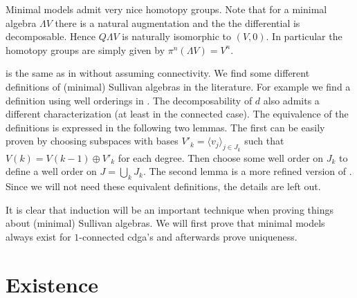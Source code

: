 Minimal models admit very nice homotopy groups. Note that for a minimal algebra $\Lambda V$ there is a natural augmentation and the the differential is decomposable. Hence $Q \Lambda V$ is naturally isomorphic to $(V, 0)$. In particular the homotopy groups are simply given by $\pi^n(\Lambda V) = V^n$.

 is the same as in \cite{felix} without assuming connectivity. We find some different definitions of (minimal) Sullivan algebras in the literature. For example we find a definition using well orderings in \cite{hess}. The decomposability of $d$ also admits a different characterization (at least in the connected case). The equivalence of the definitions is expressed in the following two lemmas. The first can be easily proven by choosing subspaces with bases $V'_k = \langle v_j \rangle_{j \in J_k}$ such that $V(k) = V(k-1) \oplus V'_k$ for each degree. Then choose some well order on $J_k$ to define a well order on $J = \bigcup_k J_k$. The second lemma is a more refined version of . Since we will not need these equivalent definitions, the details are left out.



It is clear that induction will be an important technique when proving things about (minimal) Sullivan algebras. We will first prove that minimal models always exist for $1$-connected cdga's and afterwards prove uniqueness.

\section{Existence}

